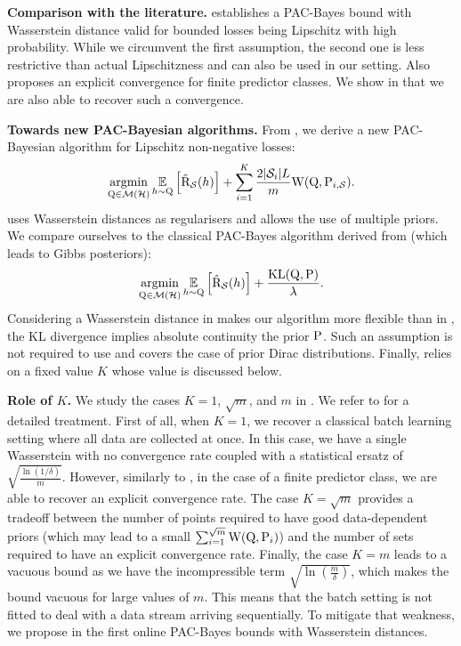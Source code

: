 \textbf{Comparison with the literature.} \cite[][Theorem 11]{amit2022integral} establishes a PAC-Bayes bound with Wasserstein distance valid for bounded losses being Lipschitz with high probability. While we circumvent the first assumption, the second one is less restrictive than actual Lipschitzness and can also be used in our setting. Also \cite[Theorem 12]{amit2022integral} proposes an explicit convergence for finite predictor classes. We show in  that we are also able to recover such a convergence. 

\textbf{Towards new PAC-Bayesian algorithms.} From , we derive a new PAC-Bayesian algorithm for Lipschitz non-negative losses:
\begin{equation}
    \label{eq:batch-alg}
    \argmin_{\Q\in\Mcal(\H)} \EE_{h\sim \Q}\left[\Riskhat_{\S}(h)\right] + \sum_{i=1}^{K} \frac{2|\S_i|L}{m} \W(\Q, \P_{i,\S}).
\end{equation}
 uses Wasserstein distances as regularisers and allows the use of multiple priors. 
We compare ourselves to the classical PAC-Bayes algorithm derived from \cite[][Theorem 1.2.6]{catoni2007pac} (which leads to Gibbs posteriors):
\begin{equation}
    \label{eq:catoni-alg}
    \argmin_{\Q\in\Mcal(\H)} \EE_{h\sim \Q}\left[\Riskhat_{\S}(h)\right] +  \frac{\operatorname{KL}(\Q,\P)}{\lambda}.
\end{equation}
Considering a Wasserstein distance in  makes our algorithm more flexible than in , the KL divergence implies absolute continuity \wrt the prior $\P$.
Such an assumption is not required to use  and covers the case of prior Dirac distributions.
Finally,  relies on a fixed value $K$ whose value is discussed below.

\textbf{Role of $K$.} 
We study the cases $K=1$, $\sqrt{m}$, and $m$ in . We refer to  for a detailed treatment.
First of all, when $K=1$, we recover a classical batch learning setting where all data are collected at once.
In this case, we have a single Wasserstein with no convergence rate coupled with a statistical ersatz of $\sqrt{\frac{\ln(1/\delta)}{m}}$.
However, similarly to \cite[][Theorem 12]{amit2022integral}, in the case of a finite predictor class, we are able to recover an explicit convergence rate.
The case $K=\sqrt{m}$ provides a tradeoff between the number of points required to have good data-dependent priors (which may lead to a small $\sum_{i=1}^{\sqrt{m}}\W(\Q, \P_i)$) and the number of sets required to have an explicit convergence rate. 
Finally, the case $K=m$ leads to a vacuous bound as we have the incompressible term $\sqrt{\ln\left(\frac{m}{\delta}\right)}$, which makes the bound vacuous for large values of $m$.
This means that the batch setting is not fitted to deal with a data stream arriving sequentially. To mitigate that weakness, we propose in  the first online PAC-Bayes bounds with Wasserstein distances.

